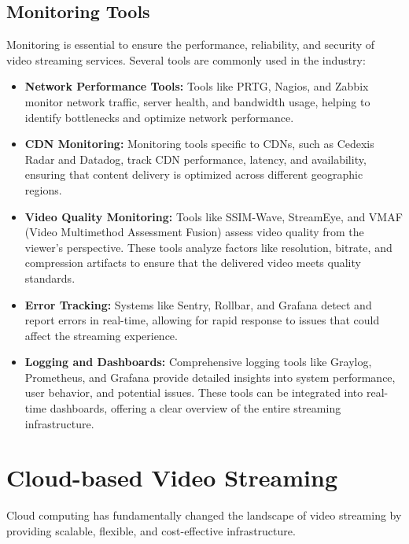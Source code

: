 \subsection{Monitoring Tools}
Monitoring is essential to ensure the performance, reliability, and security of video streaming services. Several tools are commonly used in the industry:

\begin{itemize}
    \item \textbf{Network Performance Tools:} Tools like PRTG, Nagios, and Zabbix monitor network traffic, server health, and bandwidth usage, helping to identify bottlenecks and optimize network performance\cite{network_monitoring}.
    
    \item \textbf{CDN Monitoring:} Monitoring tools specific to CDNs, such as Cedexis Radar and Datadog, track CDN performance, latency, and availability, ensuring that content delivery is optimized across different geographic regions\cite{cdn_monitoring}.
    
    \item \textbf{Video Quality Monitoring:} Tools like SSIM-Wave, StreamEye, and VMAF (Video Multimethod Assessment Fusion) assess video quality from the viewer's perspective. These tools analyze factors like resolution, bitrate, and compression artifacts to ensure that the delivered video meets quality standards\cite{video_quality_monitoring}.
    
    \item \textbf{Error Tracking:} Systems like Sentry, Rollbar, and Grafana detect and report errors in real-time, allowing for rapid response to issues that could affect the streaming experience\cite{error_tracking}.
    
    \item \textbf{Logging and Dashboards:} Comprehensive logging tools like Graylog, Prometheus, and Grafana provide detailed insights into system performance, user behavior, and potential issues. These tools can be integrated into real-time dashboards, offering a clear overview of the entire streaming infrastructure\cite{logging_monitoring}.
\end{itemize}

\section{Cloud-based Video Streaming}
Cloud computing has fundamentally changed the landscape of video streaming by providing scalable, flexible, and cost-effective infrastructure.

